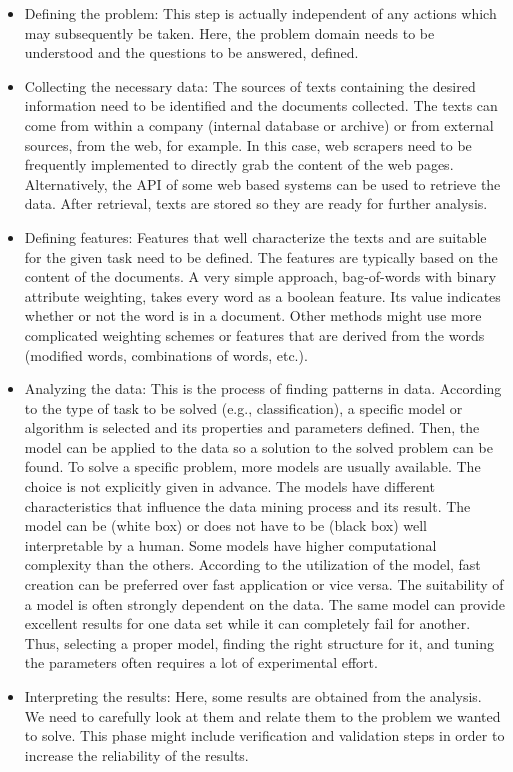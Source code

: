 \documentclass[11pt,openany,executivepaper]{book}
\begin{document}
\begin{itemize}
  \item Defining the problem: This step is actually independent of any actions which may subsequently be taken. Here, the problem domain needs to be understood and the questions to be answered, defined.
  \item Collecting the necessary data: The sources of texts containing the desired information need to be identified and the documents collected. The texts can come from within a company (internal database or archive) or from external sources, from the web, for example. In this case, web scrapers need to be frequently implemented to directly grab the content of the web pages. Alternatively, the API of some web based systems can be used to retrieve the data. After retrieval, texts are stored so they are ready for further analysis.
  \item Defining features: Features that well characterize the texts and are suitable for the given task need to be defined. The features are typically based on the content of the documents. A very simple approach, bag-of-words with binary attribute weighting, takes every word as a boolean feature. Its value indicates whether or not the word is in a document. Other methods might use more complicated weighting schemes or features that are derived from the words (modified words, combinations of words, etc.).
  \item Analyzing the data: This is the process of finding patterns in data. According to the type of task to be solved (e.g., classification), a specific model or algorithm is selected and its properties and parameters defined. Then, the model can be applied to the data so a solution to the solved problem can be found. To solve a specific problem, more models are usually available. The choice is not explicitly given in advance. The models have different characteristics that influence the data mining process and its result. The model can be (white box) or does not have to be (black box) well interpretable by a human. Some models have higher computational complexity than the others. According to the utilization of the model, fast creation can be preferred over fast application or vice versa. The suitability of a model is often strongly dependent on the data. The same model can provide excellent results for one data set while it can completely fail for another. Thus, selecting a proper model, finding the right structure for it, and tuning the parameters often requires a lot of experimental effort.
  \item Interpreting the results: Here, some results are obtained from the analysis. We need to carefully look at them and relate them to the problem we wanted to solve. This phase might include verification and validation steps in order to increase the reliability of the results.
\end{itemize}
\end{document}
